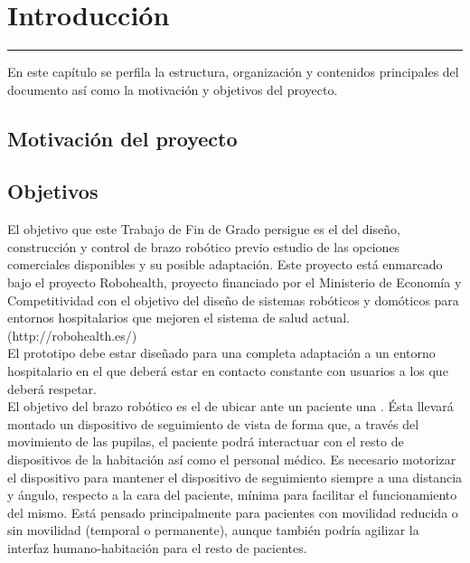 \chapter{Introducción} \label{chap:Introduccion}
\hrule
\vspace{3mm}

En este capítulo se perfila la estructura, organización y contenidos principales del documento así como la motivación y objetivos del proyecto.


\section{Motivación del proyecto}



\section{Objetivos}

El objetivo que este Trabajo de Fin de Grado persigue es el del diseño, construcción y control de brazo robótico previo estudio de las opciones comerciales disponibles y su posible adaptación. Este proyecto está enmarcado bajo el proyecto Robohealth, proyecto financiado por el Ministerio de Economía y Competitividad con el objetivo del diseño de sistemas robóticos y domóticos para entornos hospitalarios que mejoren el sistema de salud actual. (\completar http://robohealth.es/)
\\

El  prototipo debe estar diseñado para una completa adaptación a un entorno hospitalario en el que deberá estar en contacto constante con usuarios a los que deberá respetar.
\\

El objetivo del brazo robótico es el de ubicar ante un paciente una . Ésta llevará montado un dispositivo de seguimiento de vista de forma que, a través del movimiento de las pupilas, el paciente podrá interactuar con el resto de dispositivos de la habitación así como el personal médico. Es necesario motorizar el dispositivo para mantener el dispositivo de seguimiento siempre a una distancia y ángulo, respecto a la cara del paciente, mínima para facilitar el funcionamiento del mismo. Está pensado principalmente para pacientes con movilidad reducida o sin movilidad (temporal o permanente), aunque también podría agilizar la interfaz humano-habitación para el resto de pacientes.
\\

